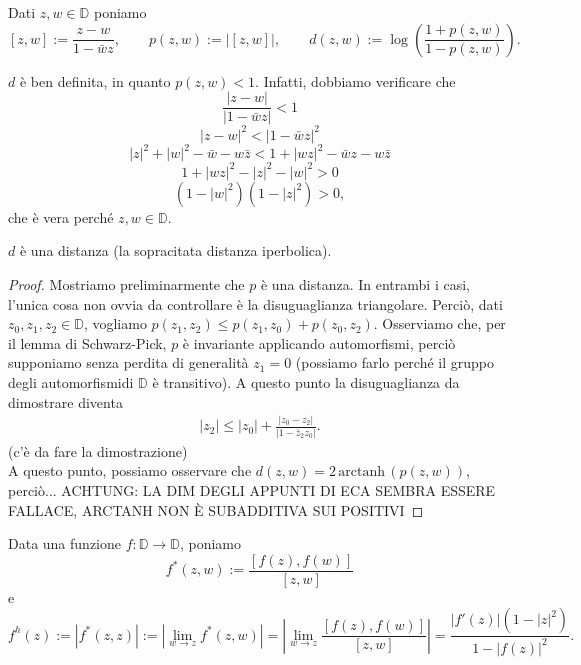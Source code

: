 \begin{defn}
  Dati $z, w \in \mathbb{D}$ poniamo
  $$[z,w]:=\frac{z-w}{1-\bar{w}z}, \qquad p(z,w):=|[z,w]|, \qquad d(z,w):=\log\left(\frac{1+p(z,w)}{1-p(z,w)}\right).$$
\end{defn}

$d$ è ben definita, in quanto $p(z,w)<1$. Infatti, dobbiamo verificare che
  $$\frac{|z-w|}{|1-\bar{w}z|} < 1$$
  $$|z-w|^2 < |1-\bar{w}z|^2$$
  $$|z|^2+|w|^2-\bar{w}-w\bar{z} < 1+|wz|^2-\bar{w}z-w\bar{z}$$
  $$1+|wz|^2-|z|^2-|w|^2 > 0$$
  $$(1-|w|^2)(1-|z|^2) > 0,$$
che è vera perché $z, w \in \mathbb{D}$.

\begin{prop}
  $d$ è una distanza (la sopracitata distanza iperbolica).
\end{prop}

\begin{proof}
  Mostriamo preliminarmente che $p$ è una distanza. In entrambi i casi, l'unica cosa non ovvia da controllare è la disuguaglianza triangolare. Perciò, dati $z_0, z_1, z_2 \in \mathbb{D}$, vogliamo $p(z_1,z_2) \le p(z_1,z_0)+p(z_0,z_2)$. Osserviamo che, per il lemma di Schwarz-Pick, $p$ è invariante applicando automorfismi, perciò supponiamo senza perdita di generalità $z_1=0$ (possiamo farlo perché il gruppo degli automorfismidi $\mathbb{D}$ è transitivo). A questo punto la disuguaglianza da dimostrare diventa
  \begin{align*}
    |z_2| \le |z_0|+\frac{|z_0-z_2|}{|1-\bar{z}_2z_0|}.
  \end{align*}
  (c'è da fare la dimostrazione) \\
  A questo punto, possiamo osservare che $d(z,w) =2\,\text{arctanh}\,(p(z,w))$, perciò... ACHTUNG: LA DIM DEGLI APPUNTI DI ECA SEMBRA ESSERE FALLACE, ARCTANH NON È SUBADDITIVA SUI POSITIVI
\end{proof}

\begin{defn}
  Data una funzione $f: \mathbb{D} \longrightarrow \mathbb{D}$, poniamo
  $$f^*(z,w):=\frac{[f(z),f(w)]}{[z,w]}$$
  e
  $$f^h(z):=|f^*(z,z)|:=\left|\lim_{w \longrightarrow z} f^*(z,w)\right|=\left|\lim_{w \longrightarrow z} \frac{[f(z),f(w)]}{[z,w]}\right|=\frac{|f'(z)|(1-|z|^2)}{1-|f(z)|^2}.$$
\end{defn}

